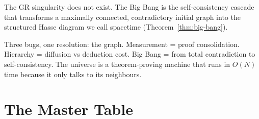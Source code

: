 \documentclass[11pt, a4paper, openany]{book}
\newcounter{thm}[chapter]
\begin{document}
The GR singularity does not exist. The Big Bang is the self-consistency
cascade that transforms a maximally connected, contradictory initial
graph into the structured Hasse diagram we call spacetime
(Theorem~\ref{thm:big-bang}).

\begin{logicalreading}
Three bugs, one resolution: the graph. Measurement = proof
consolidation. Hierarchy = diffusion vs deduction cost. Big Bang =
from total contradiction to self-consistency. The universe is a
theorem-proving machine that runs in $O(N)$ time because it only
talks to its neighbours.
\end{logicalreading}

\section{The Master Table}\label{sec:master-table}
\end{document}
